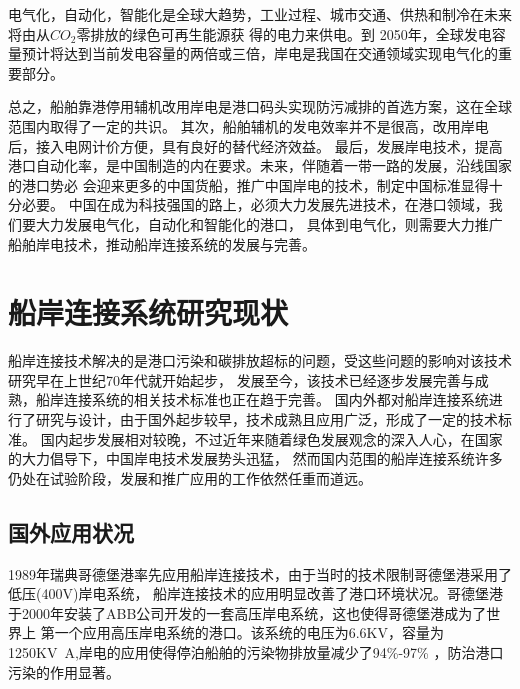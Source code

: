 \begin{table}[!htp]
	\centering
	\caption[中国岸电替代辅机发电的减排表现]{中国岸电替代辅机发电的减排表现\cite{SP3}}
	\label{tab:岸电替代效益}
\end{table}

电气化，自动化，智能化是全球大趋势，工业过程、城市交通、供热和制冷在未来将由从$CO_{2}$零排放的绿色可再生能源获
得的电力来供电。到 2050年，全球发电容量预计将达到当前发电容量的两倍或三倍，岸电是我国在交通领域实现电气化的重要部分。

总之，船舶靠港停用辅机改用岸电是港口码头实现防污减排的首选方案，这在全球范围内取得了一定的共识。
其次，船舶辅机的发电效率并不是很高，改用岸电后，接入电网计价方便，具有良好的替代经济效益。
最后，发展岸电技术，提高港口自动化率，是中国制造的内在要求。未来，伴随着一带一路的发展，沿线国家的港口势必
会迎来更多的中国货船，推广中国岸电的技术，制定中国标准显得十分必要。
中国在成为科技强国的路上，必须大力发展先进技术，在港口领域，我们要大力发展电气化，自动化和智能化的港口，
具体到电气化，则需要大力推广船舶岸电技术，推动船岸连接系统的发展与完善。


\section{船岸连接系统研究现状}
船岸连接技术解决的是港口污染和碳排放超标的问题，受这些问题的影响对该技术研究早在上世纪70年代就开始起步，
发展至今，该技术已经逐步发展完善与成熟，船岸连接系统的相关技术标准也正在趋于完善。
国内外都对船岸连接系统进行了研究与设计，由于国外起步较早，技术成熟且应用广泛，形成了一定的技术标准。
国内起步发展相对较晚，不过近年来随着绿色发展观念的深入人心，在国家的大力倡导下，中国岸电技术发展势头迅猛，
然而国内范围的船岸连接系统许多仍处在试验阶段，发展和推广应用的工作依然任重而道远\cite{SP4}。

\subsection{国外应用状况}
1989年瑞典哥德堡港率先应用船岸连接技术，由于当时的技术限制哥德堡港采用了低压(400V)岸电系统，
船岸连接技术的应用明显改善了港口环境状况。哥德堡港于2000年安装了ABB公司开发的一套高压岸电系统，这也使得哥德堡港成为了世界上
第一个应用高压岸电系统的港口。该系统的电压为6.6KV，容量为1250\si{KV.A},岸电的应用使得停泊船舶的污染物排放量减少了94\%-97\%
\cite{SP4}，防治港口污染的作用显著。


